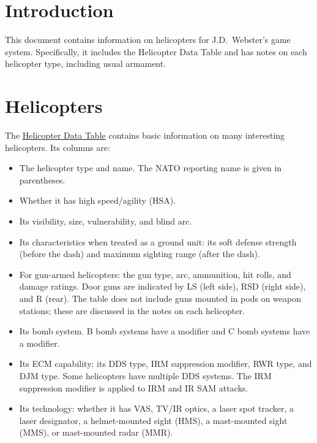 \documentclass{report}
\begin{document}

\chapter{Introduction}

\noindent
This document contains information on helicopters for J.D.\ Webster's {\AirPow} game system. Specifically, it includes the Helicopter Data Table and has notes on each helicopter type, including usual armament.

\setcounter{tocdepth}{1}
\tableofcontents


\chapter{Helicopters}

The \hyperlink{table:helicopter-data}{Helicopter Data Table} contains basic information on many interesting helicopters. Its columns are:
\begin{itemize}
    \item The helicopter type and name. The NATO reporting name is given in parentheses.
    \item Whether it has high speed/agility (HSA).
    \item Its visibility, size, vulnerability, and blind arc.
    \item Its characteristics when treated as a ground unit: its soft defense strength (before the dash) and maximum sighting range (after the dash).
    \item For gun-armed helicopters: the gun type, arc, ammunition, hit rolls, and damage ratings. Door guns are indicated by LS (left side), RSD (right side), and R (rear). The table does not include guns mounted in pods on weapon stations; these are discussed in the notes on each helicopter.
    \item Its bomb system. B bomb systems have a  modifier and C bomb systems have a  modifier.
    \item Its ECM capability: its DDS type, IRM suppression modifier, RWR type, and DJM type. Some helicopters have multiple DDS systems. The IRM suppression modifier is applied to IRM and IR SAM attacks.
    \item Its technology: whether it has VAS, TV/IR optics, a laser spot tracker, a laser designator, a helmet-mounted sight (HMS), a mast-mounted sight (MMS), or mast-mounted radar (MMR).
\end{itemize}
\end{document}
